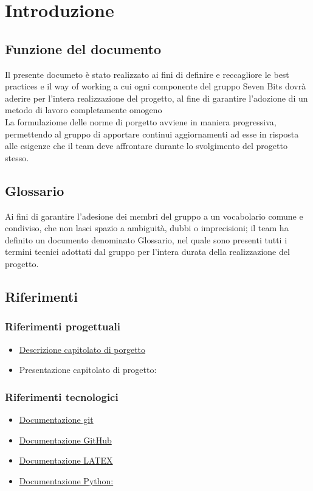 \section{Introduzione}
    \subsection{Funzione del documento}
    Il presente documeto è stato realizzato ai fini di definire e reccagliore le best 
    practices e il way of working a cui ogni componente del gruppo Seven Bits dovrà
    aderire per l'intera realizzazione del progetto, al fine di garantire l'adozione 
    di un metodo di lavoro completamente omogeno\\
    La formulaziome delle norme di porgetto avviene in maniera progressiva, permettendo
    al gruppo di apportare continui aggiornamenti ad esse in risposta alle esigenze che
    il team deve affrontare durante lo svolgimento del progetto stesso.\\ 

    \subsection{Glossario}
    Ai fini di garantire l'adesione dei membri del gruppo a un vocabolario comune 
    e condiviso, che non lasci spazio a ambiguità, dubbi o imprecisioni; il team ha definito
    un documento denominato Glossario, nel quale sono presenti tutti i termini tecnici adottati
    dal gruppo per l'intera durata della realizzazione del progetto.

    \subsection{Riferimenti}
        \subsubsection{Riferimenti progettuali}
        \begin{itemize}
            \item \href{https://www.math.unipd.it/~tullio/IS-1/2024/Progetto/C4.pdf}{Descrizione capitolato di porgetto}
            \item Presentazione capitolato di progetto: 
        \end{itemize}
        \subsubsection{Riferimenti tecnologici}
        \begin{itemize}
            \item \href{https://git-scm.com/docs}{Documentazione git}
            \item \href{https://docs.github.com/en}{Documentazione GitHub}
            \item \href{https://www.latex-project.org/help/documentation/}{Documentazione LATEX}
            \item \href{https://www.python.org/doc/}{Documentazione Python:}
        \end{itemize}